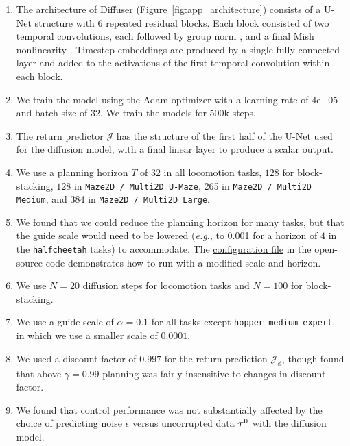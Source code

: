 \begin{appendices}
\begin{enumerate}
    \item The architecture of Diffuser (Figure~\ref{fig:app_architecture}) consists of a U-Net structure with 6 repeated residual blocks. Each block consisted of two temporal convolutions, each followed by group norm \citep{wu2018groupnorm}, and a final Mish nonlinearity \citep{misra2019mish}.
    Timestep embeddings are produced by a single fully-connected layer and added to the activations of the first temporal convolution within each block.
    \item We train the model using the Adam optimizer \citep{ba2015adam} with a learning rate of $4\mathrm{e}{-05}$ and batch size of $32$.
    We train the models for 500k steps.
    \item The return predictor $\mathcal{J}$ has the structure of the first half of the U-Net used for the diffusion model, with a final linear layer to produce a scalar output.
    \item We use a planning horizon $T$ of 32 in all locomotion tasks, $128$ for block-stacking, $128$ in \texttt{Maze2D / Multi2D U-Maze}, 265 in \texttt{Maze2D / Multi2D Medium}, and 384 in \texttt{Maze2D / Multi2D Large}.
    \item We found that we could reduce the planning horizon for many tasks, but that the guide scale would need to be lowered (\emph{e.g.}, to 0.001 for a horizon of $4$ in the \texttt{halfcheetah} tasks) to accommodate.
    The \href{https://github.com/jannerm/diffuser/blob/34d0e93296c6d8649187e6790ee41cf0c59e3631/config/locomotion.py#L163-L178}{configuration file} in the open-source code demonstrates how to run with a modified scale and horizon.
    \item We use $N=20$ diffusion steps for locomotion tasks and $N=100$ for block-stacking.
    \item We use a guide scale of $\alpha=0.1$ for all tasks except \texttt{hopper-medium-expert}, in which we use a smaller scale of $0.0001$.
    \item We used a discount factor of $0.997$ for the return prediction $\mathcal{J}_\phi$, though found that above $\gamma=0.99$ planning was fairly insensitive to changes in discount factor.
    \item We found that control performance was not substantially affected by the choice of predicting noise $\epsilon$ versus uncorrupted data $\bm{\tau}^{0}$ with the diffusion model.
\end{enumerate}

\end{appendices}